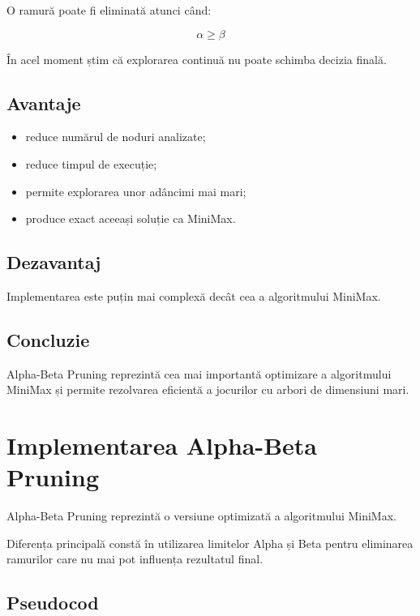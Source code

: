 \documentclass[12pt,a4paper]{article}
\begin{document}
O ramură poate fi eliminată atunci când:

\[
\alpha \geq \beta
\]

În acel moment știm că explorarea continuă nu poate schimba decizia finală.

\subsection{Avantaje}

\begin{itemize}
\item reduce numărul de noduri analizate;
\item reduce timpul de execuție;
\item permite explorarea unor adâncimi mai mari;
\item produce exact aceeași soluție ca MiniMax.
\end{itemize}

\subsection{Dezavantaj}

Implementarea este puțin mai complexă decât cea a algoritmului MiniMax.

\subsection{Concluzie}

Alpha-Beta Pruning reprezintă cea mai importantă optimizare a algoritmului MiniMax și permite rezolvarea eficientă a jocurilor cu arbori de dimensiuni mari.














\section{Implementarea Alpha-Beta Pruning}

Alpha-Beta Pruning reprezintă o versiune optimizată a algoritmului MiniMax.

Diferența principală constă în utilizarea limitelor Alpha și Beta pentru eliminarea ramurilor care nu mai pot influența rezultatul final.

\subsection{Pseudocod}
\end{document}
